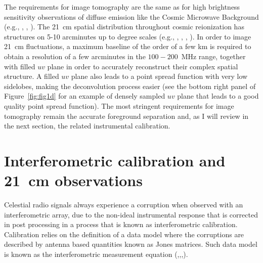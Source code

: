The requirements for image tomography are the same as for high brightness sensitivity observations of diffuse emission like the Cosmic Microwave Background (e.g., \cite{halverson02}, \cite{dickinson04}, \cite{readhead04}). The 21~cm spatial distribution throughout cosmic reionization has structures on 5-10 arcminutes up to degree scales (e.g., \cite{majumdar12}, \cite{datta12}, \cite{mellema13}, \cite{kakiichi17}). In order to image 21~cm fluctuations, a maximum baseline of the order of a few km is required to obtain a resolution of a few arcminutes in the $100-200$~MHz range, together with filled $uv$ plane in order to accurately reconstruct their complex spatial structure. A filled $uv$ plane also leads to a point spread function with very low sidelobes, making the deconvolution process easier (see the bottom right panel of Figure~\ref{fig:fig1d} for an example of densely sampled $uv$ plane that leads to a good quality point spread function). The most stringent requirements for image tomography remain the accurate foreground separation and, as I will review in the next section, the related instrumental calibration.



\section{Interferometric calibration and 21~cm observations}
\label{sec:challenges}

Celestial radio signals always experience a corruption when observed with an interferometric array, due to the non-ideal instrumental response that is corrected in post processing in a process that is known as interferometric calibration. Calibration relies on the definition of a data model where the corruptions are described by antenna based quantities known as Jones matrices. Such data model is known as the interferometric measurement equation (\cite{hamaker96},\cite{smirnov11},\cite{smirnov11b},\cite{smirnov11c}).

